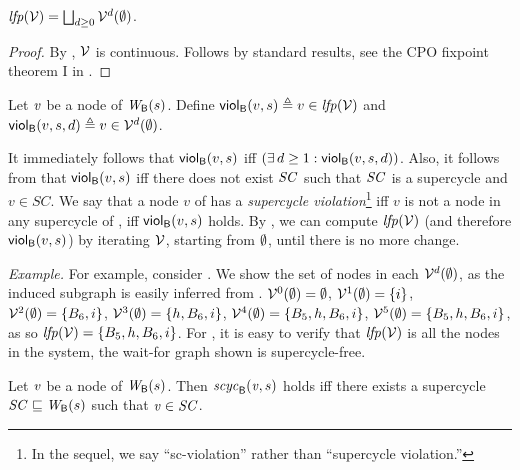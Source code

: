 \begin{proposition}  \label{prop:computeLFP}
$\lfp{\VFs} = \JOIN_{d \ge 0} \VFs^{d} (\ewfg)$.
\end{proposition}
%
\begin{proof}
By , $\VFs$ is continuous. Follows by standard results, \eg see the CPO fixpoint theorem I in 
\cite{DP02}.
\end{proof}



\begin{definition}
\label{def:supercycle-violation}
\label{def:supercycle.violation}
\label{defn:supercycle.violation}
Let $\ndv$ be a node of $\wfg{\B}{s}$. Define
$\scV{v}{s} \df v \in \lfp{\VFs}$ and 
$\scVd{v}{d}{s} \df v \in \VFs^{d} (\ewfg)$.
\end{definition}
%
It immediately follows that $\scV{v}{s}$ iff  $(\ex d \ge 1: \scVd{v}{d}{s})$.
Also, it follows from  that $\scV{v}{s}$ iff there does not exist $\SC$ such that $\SC$ is a supercycle and $v \in SC$.
We say that a node $v$ of  has a \emph{supercycle violation}\footnote{In the sequel, we say ``sc-violation'' rather than ``supercycle violation.''} iff $v$ is not a node in any supercycle of , 
\ie iff $\scV{v}{s}$ holds. 
By , we can compute $\lfp{\VFs}$ (and therefore $\scV{v}{s}$) by iterating $\VFs$, starting from $\ewfg$, until there is no more change.

\vspace{1ex}
\textit{Example.} 
For example, consider . We show the set of nodes in each $\VFs^{d} (\ewfg)$, as the induced subgraph is easily inferred from .
$\VFs^{0} (\ewfg) = \ewfg$,
$\VFs^{1} (\ewfg) = \set{i}$, 
$\VFs^{2} (\ewfg) = \set{B_6, i}$, 
$\VFs^{3} (\ewfg) = \set{h, B_6, i}$, 
$\VFs^{4} (\ewfg) = \set{B_5, h, B_6, i}$, 
$\VFs^{5} (\ewfg) = \set{B_5, h, B_6, i}$, 
as so $\lfp{\VFs} = \set{B_5, h, B_6, i}$.
%
For , it is easy to verify that $\lfp{\VFs}$ is all the nodes in the system, \ie the wait-for graph shown is supercycle-free.




\begin{definition}
\label{defn:supercycle.membership}
Let $\ndv$ be a node of $\wfg{\B}{s}$. Then $\scyc{\B}{s}{\ndv}$ holds iff there exists a supercycle $\SC \subg \wfg{\B}{s}$ such that
$\ndv \in \SC$.
\end{definition}





